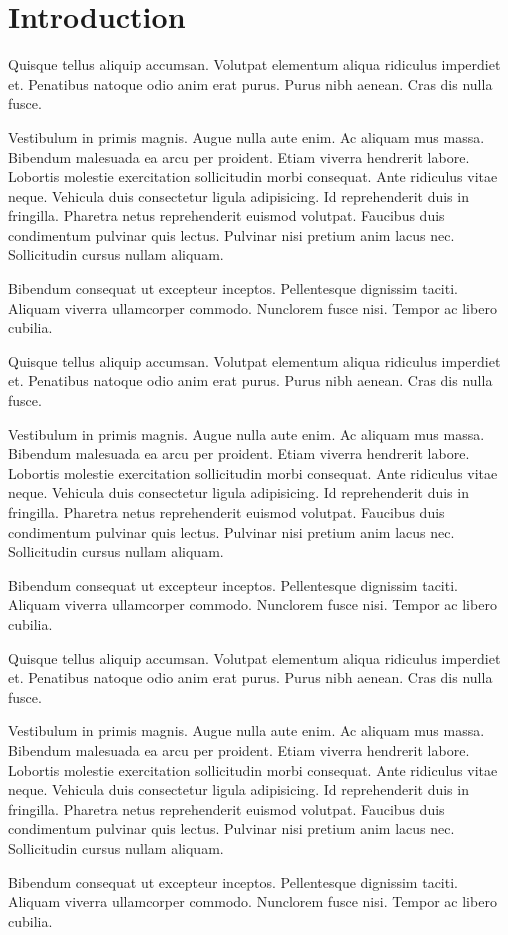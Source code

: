 \chapter{Introduction}

Quisque tellus aliquip accumsan. Volutpat elementum aliqua ridiculus imperdiet et. Penatibus natoque odio anim erat purus. Purus nibh aenean. Cras dis nulla fusce.

Vestibulum in primis magnis. Augue nulla aute enim. Ac aliquam mus massa. Bibendum malesuada ea arcu per proident. Etiam viverra hendrerit labore.
Lobortis molestie exercitation sollicitudin morbi consequat. Ante ridiculus vitae neque. Vehicula duis consectetur ligula adipisicing. Id reprehenderit duis in fringilla. Pharetra netus reprehenderit euismod volutpat.
Faucibus duis condimentum pulvinar quis lectus. Pulvinar nisi pretium anim lacus nec. Sollicitudin cursus nullam aliquam.

Bibendum consequat ut excepteur inceptos. Pellentesque dignissim taciti. Aliquam viverra ullamcorper commodo. Nunclorem fusce nisi. Tempor ac libero cubilia.

Quisque tellus aliquip accumsan. Volutpat elementum aliqua ridiculus imperdiet et. Penatibus natoque odio anim erat purus. Purus nibh aenean. Cras dis nulla fusce.

Vestibulum in primis magnis. Augue nulla aute enim. Ac aliquam mus massa. Bibendum malesuada ea arcu per proident. Etiam viverra hendrerit labore.
Lobortis molestie exercitation sollicitudin morbi consequat. Ante ridiculus vitae neque. Vehicula duis consectetur ligula adipisicing. Id reprehenderit duis in fringilla. Pharetra netus reprehenderit euismod volutpat.
Faucibus duis condimentum pulvinar quis lectus. Pulvinar nisi pretium anim lacus nec. Sollicitudin cursus nullam aliquam.

Bibendum consequat ut excepteur inceptos. Pellentesque dignissim taciti. Aliquam viverra ullamcorper commodo. Nunclorem fusce nisi. Tempor ac libero cubilia.

Quisque tellus aliquip accumsan. Volutpat elementum aliqua ridiculus imperdiet et. Penatibus natoque odio anim erat purus. Purus nibh aenean. Cras dis nulla fusce.

Vestibulum in primis magnis. Augue nulla aute enim. Ac aliquam mus massa. Bibendum malesuada ea arcu per proident. Etiam viverra hendrerit labore.
Lobortis molestie exercitation sollicitudin morbi consequat. Ante ridiculus vitae neque. Vehicula duis consectetur ligula adipisicing. Id reprehenderit duis in fringilla. Pharetra netus reprehenderit euismod volutpat.
Faucibus duis condimentum pulvinar quis lectus. Pulvinar nisi pretium anim lacus nec. Sollicitudin cursus nullam aliquam.

Bibendum consequat ut excepteur inceptos. Pellentesque dignissim taciti. Aliquam viverra ullamcorper commodo. Nunclorem fusce nisi. Tempor ac libero cubilia.